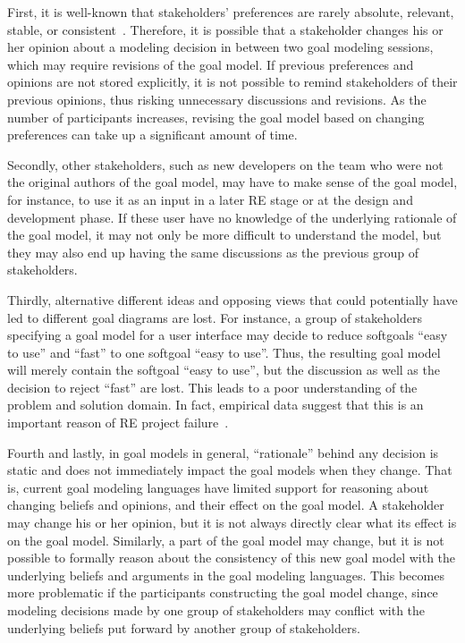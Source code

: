 First, it is well-known that stakeholders' preferences are rarely absolute, relevant, stable, or consistent~\cite{march1978bounded}. Therefore, it is possible that a stakeholder changes his or her opinion about a modeling decision in between two goal modeling sessions, which may require revisions of the goal model. If previous preferences and opinions are not stored explicitly, it is not possible to remind stakeholders of their previous opinions, thus risking unnecessary discussions and revisions. As the number of participants increases, revising the goal model based on changing preferences can take up a significant amount of time. 

Secondly, other stakeholders, such as new developers on the team who were not the original authors of the goal model, may have to make sense of the goal model, for instance, to use it as an input in a later RE stage or at the design and development phase. If these user have no knowledge of the underlying rationale of the goal model, it may not only be more difficult to understand the model, but they may also end up having the same discussions as the previous group of stakeholders.

Thirdly, alternative different ideas and opposing views that could potentially have led to different goal diagrams are lost. For instance, a group of stakeholders specifying a goal model for a user interface may decide to reduce softgoals ``easy to use'' and ``fast'' to one softgoal ``easy to use''. Thus, the resulting goal model will merely contain the softgoal ``easy to use'', but the discussion as well as the decision to reject ``fast'' are lost. This leads to a poor understanding of the problem and solution domain. In fact, empirical data suggest that this is an important reason of RE project failure~\cite{curtis1988field}. 

Fourth and lastly, in goal models in general, ``rationale'' behind any decision is static and does not immediately impact the goal models when they change. That is, current goal modeling languages have limited support for reasoning about changing beliefs and opinions, and their effect on the goal model. A stakeholder may change his or her opinion, but it is not always directly clear what its effect is on the goal model. Similarly, a part of the goal model may change, but it is not possible to formally reason about the consistency of this new goal model with the underlying beliefs and arguments in the goal modeling languages. This becomes more problematic if the participants constructing the goal model change, since modeling decisions made by one group of stakeholders may conflict with the underlying beliefs put forward by another group of stakeholders.

